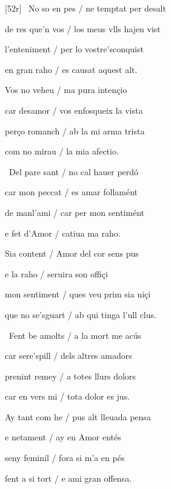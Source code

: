 \documentclass[12pt]{article}
\begin{document}
\begin{estrofa}

 [52r] \textparagraph\  No so en pes / ne temptat  per desalt

 de res que'n vos / los meus vlls hajen vist

 l'enteniment / per lo vostre'sconquist

 en gran raho / es causat aquest alt.

 Vos no veheu / ma pura inten\c{c}io

 car desamor / vos enfosqueix la vista

 per\c{c}o romanch / ab la mi arma trista

 com no mirau / la mia afectio.

\end{estrofa}



\begin{estrofa}

 \textparagraph\  Del pare sant / no cal hauer perd\'{o}

 car mon peccat / es amar follam\'{e}nt

 de manl'ami / car per mon sentim\'{e}nt

 e fet d'Amor / catiua ma raho.

 Sia content / Amor del cor sens pus

 e la raho / seruira son offi\c{c}i

 mon sentiment / ques veu prim sia ni\c{c}i

 que no se'sguart / ab qui tinga l'ull clus.

\end{estrofa}



\begin{estrofa}

 \textparagraph\  Fent be amolts / a la mort me ac\'{u}s

 car sere'spill / dels altres amadors

 prenint remey / a totes llurs dolors

 car en vers mi / tota dolor es jus.

 Ay tant com he / pus alt lleuada pensa

 e netament / ay en Amor ent\'{e}s

 seny feminil / fora si m'a en p\'{e}s

 fent a si tort / e ami gran offensa.

\end{estrofa}
\end{document}

